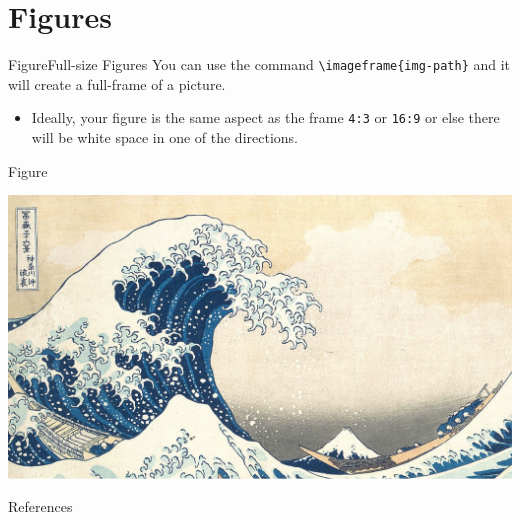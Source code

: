 \documentclass[aspectratio=169,t]{beamer}
\begin{document}
\section{Figures}


\begin{frame}{Figure}{Full-size Figures}
  You can use the command \texttt{\textbackslash imageframe\{img-path\}} and it will create a full-frame of a picture. 
  
  \begin{itemize}
  \item Ideally, your figure is the same aspect as the frame \texttt{4:3} or \texttt{16:9} or else there will be white space in one of the directions.
  \end{itemize}
\end{frame}

\begin{frame}{Figure}{}
  \begin{adjustbox}{width = 0.7\textwidth, center}
  \includegraphics{img/kanagawa_16_9.png}
  \end{adjustbox}
\end{frame}

\begin{frame}[allowframebreaks]{References}
  \printbibliography
\end{frame}
\appendix
\end{document}
